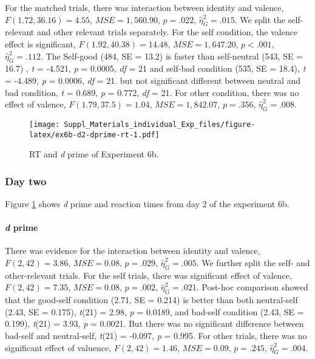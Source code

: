\documentclass[man]{apa6}
\let\oldparagraph\paragraph
\renewcommand{\paragraph}[1]{\oldparagraph{#1}\mbox{}}
\begin{document}
For the matched trials, there was interaction between identity and valence, \(F(1.72, 36.16) = 4.55\), \(\mathit{MSE} = 1,560.90\), \(p = .022\), \(\hat{\eta}^2_G = .015\). We split the self-relevant and other relevant trials separately. For the self condition, the valence effect is significant, \(F(1.92, 40.38) = 14.48\), \(\mathit{MSE} = 1,647.20\), \(p < .001\), \(\hat{\eta}^2_G = .112\). The Self-good (484, SE = 13.2) is faster than self-neutral (543, SE = 16.7) , \emph{t} = -4.521, \emph{p} = 0.0005, \emph{df} = 21 and self-bad condition (535, SE = 18.4), \emph{t} = -4.489, \emph{p} = 0.0006, \emph{df} = 21. but not significant different between neutral and bad condition, \emph{t} = 0.689, \emph{p} = 0.772, \emph{df} = 21. For other condition, there was no effect of valence, \(F(1.79, 37.5) = 1.04\), \(\mathit{MSE} = 1,842.07\), \(p = .356\), \(\hat{\eta}^2_G = .008\).

\begin{figure}
\centering
\texttt{[image: Suppl\_Materials\_individual\_Exp\_files/figure-latex/ex6b-d2-dprime-rt-1.pdf]}
\caption{\label{fig:ex6b-d2-dprime-rt}RT and \emph{d} prime of Experiment 6b.}
\end{figure}

\hypertarget{day-two}{%
\subsubsection{Day two}\label{day-two}}

Figure \ref{fig:ex6b-d2-dprime-rt} shows \emph{d} prime and reaction times from day 2 of the experiment 6b.

\hypertarget{d-prime-8}{%
\paragraph{\texorpdfstring{\emph{d} prime}{d prime}}\label{d-prime-8}}

There was evidence for the interaction between identity and valence, \(F(2, 42) = 3.86\), \(\mathit{MSE} = 0.08\), \(p = .029\), \(\hat{\eta}^2_G = .005\). We further split the self- and other-relevant trials. For the self trials, there was significant effect of valence, \(F(2, 42) = 7.35\), \(\mathit{MSE} = 0.08\), \(p = .002\), \(\hat{\eta}^2_G = .021\). Post-hoc comparison showed that the good-self condition (2.71, SE = 0.214) is better than both neutral-self (2.43, SE = 0.175), \emph{t}(21) = 2.98, \emph{p} = 0.0189, and bad-self condition (2.43, SE = 0.199), \emph{t}(21) = 3.93, \emph{p} = 0.0021. But there was no significant difference between bad-self and neutral-self, \emph{t}(21) = -0.097, \emph{p} = 0.995. For other trials, there was no significant effect of valuence, \(F(2, 42) = 1.46\), \(\mathit{MSE} = 0.09\), \(p = .245\), \(\hat{\eta}^2_G = .004\).
\end{document}
